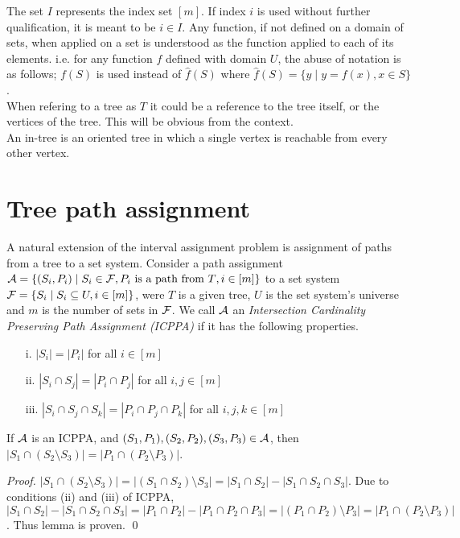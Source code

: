 \documentclass{llncs}
\def\cA{{\cal A}}
\def\cF{{\cal F}}
\begin{document}
\noindent
The set $I$ represents the index set $[m]$. If index $i$ is used
without further qualification, it is meant to be $i \in I$. Any
function, if not defined on a domain of sets, when applied on a set is
understood as the function applied to 
each of its elements. i.e. for any function $f$ defined with domain $U$, the abuse of
notation is as follows; $f(S)$ is used instead of $\hat f(S)$ where
$\hat f(S) = \{y \mid y = f(x), x \in S\}$. \\

\noindent
When refering to a tree as $T$ it could be a reference to the tree
itself, or the vertices of the tree. This will be obvious from the
context.\\

\noindent
An in-tree is an oriented tree in which a single vertex is reachable from every other vertex.


\section{Tree path assignment}

A natural extension of the interval assignment problem is assignment
of paths from a tree to a set system. 
Consider a path assignment $\cA = \{(S_i, P_i) \mid S_i \in \cF, P_i
\text{ is a path from $T$}, i \in [m]\}$ to a set system $\cF = \{S_i \mid S_i
\subseteq U, i \in [m]\}$, were $T$ is a given tree, $U$
is the set system's universe and $m$ is the number of sets in $\cF$. We call $\cA$ an {\em Intersection
Cardinality Preserving Path Assignment (ICPPA)} if it has the following properties.

\begin{enumerate}
\item [i.]  $|S_i| = |P_i|$ for all $i \in [m]$
\item [ii.] $|S_i \cap S_j| = |P_i \cap P_j|$ for all $i,j \in [m]$
\item [iii.] $|S_i \cap S_j \cap S_k| = |P_i \cap P_j \cap P_k|$ for all $i,j,k \in [m]$
\end{enumerate}

\begin{lemma}
\label{lem:setminuscard}
  If $\cA$ is an ICPPA, and $(S_1, P_1),(S_2, P_2),(S_3, P_3) \in
  \cA$, then $|S_1 \cap (S_2 \setminus S_3)| = |P_1 \cap (P_2 \setminus P_3)|$.
\end{lemma}
\begin{proof}
$|S_1 \cap (S_2 \setminus S_3)| = |(S_1 \cap S_2) \setminus S_3| =
|S_1 \cap S_2| - |S_1 \cap S_2 \cap S_3|$. Due to conditions (ii) and (iii) of
ICPPA, $|S_1 \cap S_2| - |S_1 \cap S_2 \cap S_3| = |P_1 \cap P_2| - |P_1 \cap P_2 \cap
P_3| = |(P_1 \cap P_2) \setminus P_3| =  |P_1 \cap (P_2 \setminus
P_3)|$. Thus lemma is proven. \qed
\end{proof}
\end{document}
